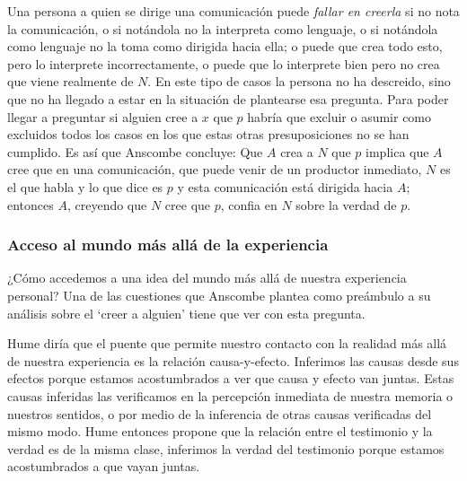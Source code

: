Una persona a quien se dirige una comunicación puede \emph{fallar en creerla} si no nota la comunicación, o si notándola no la interpreta como lenguaje, o si notándola como lenguaje no la toma como dirigida hacia ella; o puede que crea todo esto, pero lo interprete incorrectamente, o puede que lo interprete bien pero no crea que viene realmente de $N$. En este tipo de casos la persona no ha descreido, sino que no ha llegado a estar en la situación de plantearse esa pregunta. Para poder llegar a preguntar si alguien cree a $x$ que $p$ habría que excluir o asumir como excluidos todos los casos en los que estas otras presuposiciones no se han cumplido. Es así que Anscombe concluye:  Que $A$ crea a $N$ que $p$ implica que $A$ cree que en una comunicación, que puede venir de un productor inmediato, $N$ es el que habla y lo que dice es $p$ y esta comunicación está dirigida hacia $A$; entonces $A$, creyendo que $N$ cree que $p$, confia en $N$ sobre la verdad de $p$.

\subsubsection{Acceso al mundo más allá de la experiencia}
¿Cómo accedemos a una idea del mundo más allá de nuestra experiencia personal?
Una de las cuestiones que Anscombe plantea como preámbulo a su análisis sobre el
`creer a alguien' tiene que ver con esta pregunta.

Hume diría que el puente que permite nuestro contacto con la realidad más allá
de nuestra experiencia es la relación
causa-y-efecto\autocite[Cf.~][3]{anscombe2008faith:tobelieve}. Inferimos las
causas desde sus efectos porque estamos acostumbrados a ver que causa y efecto
van juntas. Estas causas inferidas las verificamos en la percepción inmediata de
nuestra memoria o nuestros sentidos, o por medio de la inferencia de otras
causas verificadas del mismo
modo\autocite[Cf.~][88]{anscombe1981parmenides:humeandjulius}. Hume entonces
propone que la relación entre el testimonio y la verdad es de la misma clase,
inferimos la verdad del testimonio porque estamos acostumbrados a que vayan
juntas\autocite[Cf.~][3]{anscombe2008faith:tobelieve}.

